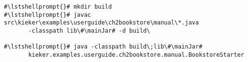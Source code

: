 \begin{lstlisting}[caption=Commands to compile and run the instrumented Bookstore under Windows,label=lst:bookstoreStarterWin]
#\lstshellprompt{}# mkdir build
#\lstshellprompt{}# javac src\kieker\examples\userguide\ch2bookstore\manual\*.java  
       -classpath lib\#\mainJar# -d build\

#\lstshellprompt{}# java -classpath build\;lib\#\mainJar#
       kieker.examples.userguide.ch2bookstore.manual.BookstoreStarter
\end{lstlisting}